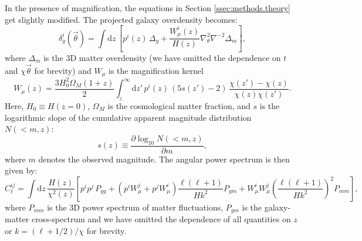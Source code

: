 \documentclass[a4paper,11pt]{article}
\newcommand{\nv}{\vec{\theta}}
\begin{document}
    In the presence of magnification, the equations in Section \ref{ssec:methods.theory} get slightly modified. The projected galaxy overdensity becomes:
    \begin{equation}
      \delta^i_g(\nv)=\int \mathrm{d}z\,\left[p^i(z)\,\Delta_g+\frac{W_\mu^i(z)}{H(z)}\nabla_\theta^2\nabla^{-2}\Delta_m\right],
    \end{equation}
    where $\Delta_m$ is the 3D matter overdensity (we have omitted the dependence on $t$ and $\chi\nv$ for brevity) and $W_\mu$ is the magnification kernel
    \begin{equation}
      W_\mu(z)=\frac{3H_0^2\Omega_M(1+z)}{2}\int_z^\infty \mathrm{d}z'\,p^i(z)\,\left(5s(z')-2\right)\,\frac{\chi(z')-\chi(z)}{\chi(z)\chi(z')}.
    \end{equation}
    Here, $H_0\equiv H(z=0)$, $\Omega_M$ is the cosmological matter fraction, and $s$ is the logarithmic slope of the cumulative apparent magnitude distribution $N(<m, z)$:
    \begin{equation}
      s(z) \equiv \frac{\partial \log_{10}N(<m, z)}{\partial m},
      \label{eq:s-func}
    \end{equation}
    where $m$ denotes the observed magnitude.
    The angular power spectrum is then given by:
    \begin{equation}\label{eq:cell_gg_wmag}
      C^{ij}_\ell = \int \mathrm{d}z\,\frac{H(z)}{\chi^2(z)}\left[p^ip^j\,P_{gg}+\left(p^iW_\mu^j+p^jW_\mu^i\right)\frac{\ell(\ell+1)}{Hk^2}P_{gm}+W_\mu^iW_\mu^j\left(\frac{\ell(\ell+1)}{Hk^2}\right)^2P_{mm}\right],
    \end{equation}
    where $P_{mm}$ is the 3D power spectrum of matter fluctuations, $P_{gm}$ is the galaxy-matter cross-spectrum and we have omitted the dependence of all quantities on $z$ or $k=(\ell+1/2)/\chi$ for brevity.
\end{document}
